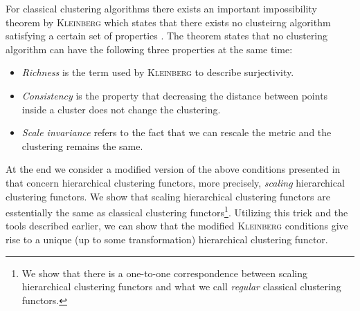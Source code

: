 For classical clustering algorithms there exists an important impossibility theorem by \textsc{Kleinberg} which states that there exists no clusteirng algorithm satisfying a certain set of properties \cite{Kleinberg2002}. The theorem states that no clustering algorithm can have the following three properties at the same time:

\begin{itemize}
    \item \emph{Richness} is the term used by \textsc{Kleinberg} to describe surjectivity.
    \item  \emph{Consistency} is the property that decreasing the distance between points inside a cluster does not change the clustering.
    \item \emph{Scale invariance} refers to the fact that we can rescale the metric and the clustering remains the same.
\end{itemize}

At the end we consider a modified version of the above conditions presented in \cite[Sec.~7.3.1]{Carlsson2010} that concern hierarchical clustering functors, more precisely, \emph{scaling} hierarchical clustering functors. We show that scaling hierarchical clustering functors are esstentially the same as classical clustering functors\footnote{We show that there is a one-to-one correspondence between scaling hierarchical clustering functors and what we call \emph{regular} classical clustering functors.}. Utilizing this trick and the tools described earlier, we can show that the modified \textsc{Kleinberg} conditions give rise to a unique (up to some transformation) hierarchical clustering functor.




